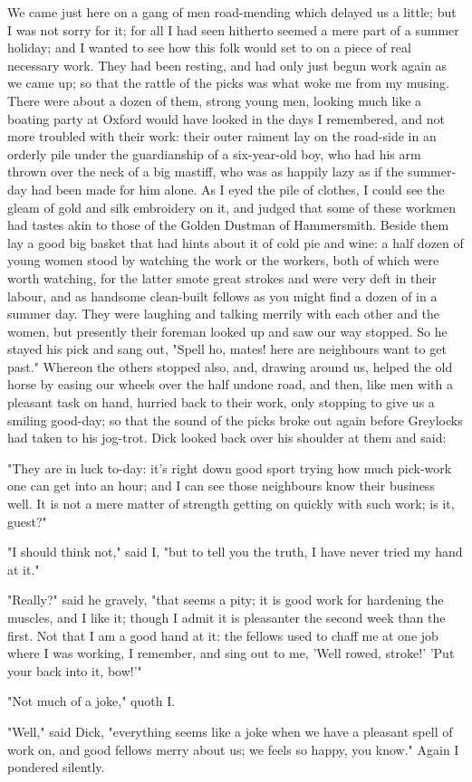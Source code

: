 We came just here on a gang of men road-mending which delayed us a
little; but I was not sorry for it; for all I had seen hitherto seemed a
mere part of a summer holiday; and I wanted to see how this folk would
set to on a piece of real necessary work. They had been resting, and had
only just begun work again as we came up; so that the rattle of the
picks was what woke me from my musing. There were about a dozen of them,
strong young men, looking much like a boating party at Oxford would have
looked in the days I remembered, and not more troubled with their work:
their outer raiment lay on the road-side in an orderly pile under the
guardianship of a six-year-old boy, who had his arm thrown over the neck
of a big mastiff, who was as happily lazy as if the summer-day had been
made for him alone. As I eyed the pile of clothes, I could see the gleam
of gold and silk embroidery on it, and judged that some of these workmen
had tastes akin to those of the Golden Dustman of Hammersmith. Beside
them lay a good big basket that had hints about it of cold pie and wine:
a half dozen of young women stood by watching the work or the workers,
both of which were worth watching, for the latter smote great strokes
and were very deft in their labour, and as handsome clean-built fellows
as you might find a dozen of in a summer day. They were laughing and
talking merrily with each other and the women, but presently their
foreman looked up and saw our way stopped. So he stayed his pick and
sang out, "Spell ho, mates! here are neighbours want to get past."
Whereon the others stopped also, and, drawing around us, helped the old
horse by easing our wheels over the half undone road, and then, like men
with a pleasant task on hand, hurried back to their work, only stopping
to give us a smiling good-day; so that the sound of the picks broke out
again before Greylocks had taken to his jog-trot. Dick looked back over
his shoulder at them and said:

"They are in luck to-day: it's right down good sport trying how much
pick-work one can get into an hour; and I can see those neighbours know
their business well. It is not a mere matter of strength getting on
quickly with such work; is it, guest?"

"I should think not," said I, "but to tell you the truth, I have never
tried my hand at it."

"Really?" said he gravely, "that seems a pity; it is good work for
hardening the muscles, and I like it; though I admit it is pleasanter
the second week than the first. Not that I am a good hand at it: the
fellows used to chaff me at one job where I was working, I remember, and
sing out to me, 'Well rowed, stroke!' 'Put your back into it, bow!'"

"Not much of a joke," quoth I.

"Well," said Dick, "everything seems like a joke when we have a pleasant
spell of work on, and good fellows merry about us; we feels so happy,
you know." Again I pondered silently.
